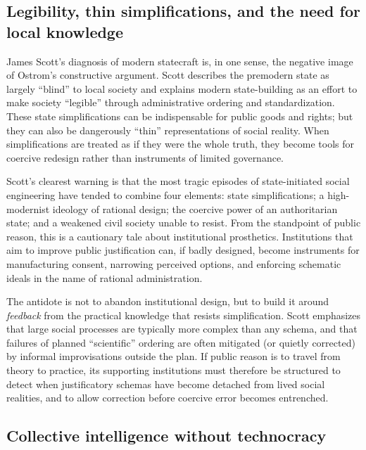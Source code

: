 \documentclass[12pt]{report}
\begin{document}
\subsection{Legibility, thin simplifications, and the need for local knowledge}

James Scott’s diagnosis of modern statecraft is, in one sense, the negative image of Ostrom’s constructive argument.
Scott describes the premodern state as largely \enquote{blind} to local society and explains modern state-building as an effort to make society \enquote{legible} through administrative ordering and standardization. \parencite[pp.~2--3]{scott1998seeing}
These state simplifications can be indispensable for public goods and rights; but they can also be dangerously \enquote{thin} representations of social reality.
When simplifications are treated as if they were the whole truth, they become tools for coercive redesign rather than instruments of limited governance.

Scott’s clearest warning is that the most tragic episodes of state-initiated social engineering have tended to combine four elements: state simplifications; a high-modernist ideology of rational design; the coercive power of an authoritarian state; and a weakened civil society unable to resist. \parencite[pp.~4--5]{scott1998seeing}
From the standpoint of public reason, this is a cautionary tale about institutional prosthetics.
Institutions that aim to improve public justification can, if badly designed, become instruments for manufacturing consent, narrowing perceived options, and enforcing schematic ideals in the name of rational administration.

The antidote is not to abandon institutional design, but to build it around \emph{feedback} from the practical knowledge that resists simplification.
Scott emphasizes that large social processes are typically more complex than any schema, and that failures of planned \enquote{scientific} ordering are often mitigated (or quietly corrected) by informal improvisations outside the plan. \parencite[p.~309]{scott1998seeing}
If public reason is to travel from theory to practice, its supporting institutions must therefore be structured to detect when justificatory schemas have become detached from lived social realities, and to allow correction before coercive error becomes entrenched.

\subsection{Collective intelligence without technocracy}
\end{document}
